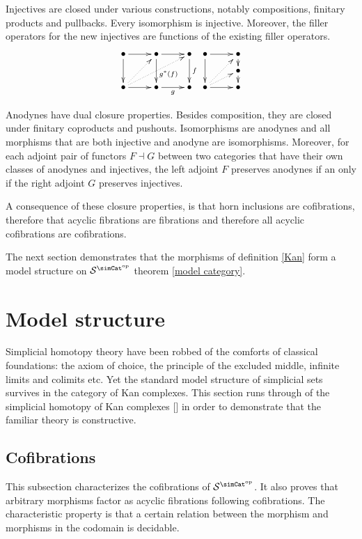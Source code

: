 \documentclass{tac}
\newcommand\cat\mathcal
\newcommand\ri{^*}
\newcommand\dual{^{\mathrm{op}}}
\newcommand\s{^{\simCat\dual}}
\newcommand\citep[1]{[\cite{#1}]}
\begin{document}
\begin{remark}[Saturation] Injectives are closed under various constructions, notably compositions, finitary products and pullbacks. Every isomorphism is injective. Moreover, the filler operators for the new injectives are functions of the existing filler operators.
\[
\xy
(0,12)*+{\bullet}="a",(12,12)*+{\bullet}="b",(24,12)*+{\bullet}="c",
(0,0)*+{\bullet}="d",(12,0)*+{\bullet}="e",(24,0)*+{\bullet}="f",
\ar "a";"b" \ar "b";"c" \ar "a";"d" \ar^(.6){g\ri(f)} "b";"e" \ar^f "c";"f" \ar "d";"e" \ar_g "e";"f"
\ar@{.>} "d";"c" \ar@{.>} "d";"b"
\endxy
\xy
(0,12)*+{\bullet}="a",(12,12)*+{\bullet}="b",(12,6)*+{\bullet}="c",(0,0)*+{\bullet}="d",(12,0)*+{\bullet}="e"
\ar "a";"b" \ar "a";"d" \ar "b";"c" \ar "c";"e" \ar "d";"e" \ar@{.>} "d";"b" \ar@{.>} "d";"c"
\endxy
\]

Anodynes have dual closure properties. Besides composition, they are closed under finitary coproducts and pushouts. Isomorphisms are anodynes and all morphisms that are both injective and anodyne are isomorphisms. Moreover, for each adjoint pair of functors $F\dashv G$ between two categories that have their own classes of anodynes and injectives, the left adjoint $F$ preserves anodynes if an only if the right adjoint $G$ preserves injectives.

A consequence of these closure properties, is that horn inclusions are cofibrations, therefore that acyclic fibrations are fibrations and therefore all acyclic cofibrations are cofibrations.
\end{remark}

The next section demonstrates that the morphisms of definition \ref{Kan} form a model structure on $\cat S\s$ theorem \ref{model category}.

\section{Model structure}
Simplicial homotopy theory have been robbed of the comforts of classical foundations: the axiom of choice, the principle of the excluded middle, infinite limits and colimits etc. Yet the standard model structure of simplicial sets survives in the category of Kan complexes. This section runs through of the simplicial homotopy of Kan complexes \citep{Hovey99,GJSHT} in order to demonstrate that the familiar theory is constructive.

\subsection{Cofibrations}
This subsection characterizes the cofibrations of $\cat S\s$. It also proves that arbitrary morphisms factor as acyclic fibrations following cofibrations. The characteristic property is that a certain relation between the morphism and morphisms in the codomain is decidable.
\end{document}
